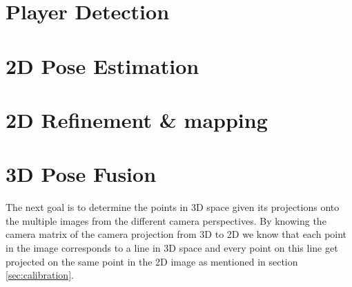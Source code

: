 \section{Player Detection}

\section{2D Pose Estimation}\label{sec:poseestimation}

\section{2D Refinement \& mapping}\label{sec:2drefinement}

\section{3D Pose Fusion}
The next goal is to determine the points in 3D space given its projections onto the multiple images from the different camera perspectives. By knowing the camera matrix of the camera projection from 3D to 2D we know that each point in the image corresponds to a line in 3D space and every point on this line get projected on the same point in the 2D image as mentioned in section \ref{sec:calibration}.

